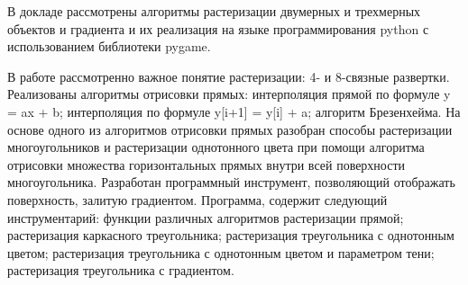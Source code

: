 


В докладе рассмотрены алгоритмы растеризации двумерных и трехмерных объектов и градиента %
и их реализация на языке программирования python с использованием библиотеки pygame. 

В работе рассмотренно важное понятие растеризации: 4- и 8-связные развертки. Реализованы алгоритмы отрисовки прямых: интерполяция прямой по формуле y = ax + b; интерполяция по формуле y[i+1] = y[i] + a; алгоритм Брезенхейма. На основе одного из алгоритмов отрисовки прямых разобран способы растеризации многоугольников  и растеризации однотонного цвета при помощи алгоритма отрисовки множества горизонтальных прямых внутри всей поверхности многоугольника. %
Разработан программный инструмент, позволяющий отображать поверхность, залитую градиентом.
Программа, содержит следующий инструментарий: функции различных алгоритмов растеризации прямой;  растеризация каркасного треугольника;   растеризация треугольника с однотонным цветом;  растеризация треугольника с однотонным цветом и параметром тени;   растеризация треугольника с градиентом.









%
